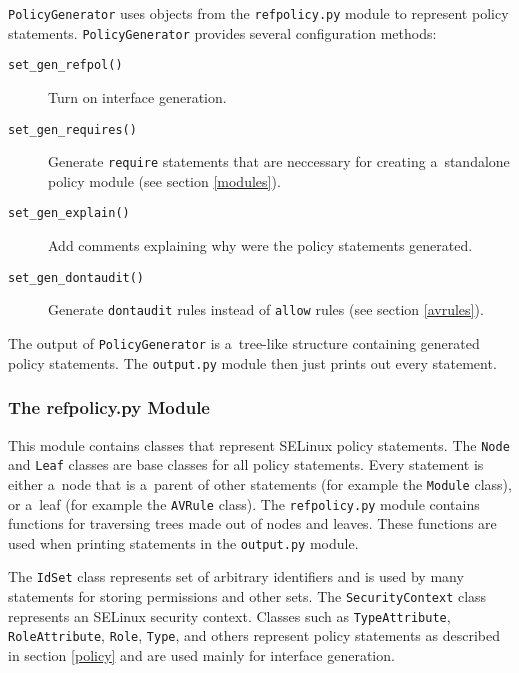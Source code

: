 \texttt{PolicyGenerator} uses objects from the \texttt{refpolicy.py} module
to represent policy statements. \texttt{PolicyGenerator} provides several
configuration methods:
\begin{description}
    \item [\texttt{set\_gen\_refpol()}] Turn on interface generation.
    \item [\texttt{set\_gen\_requires()}] Generate \texttt{require} statements
        that are neccessary for creating a~standalone policy module (see section
        \ref{modules}).
    \item [\texttt{set\_gen\_explain()}] Add comments explaining why were the
        policy statements generated.
    \item [\texttt{set\_gen\_dontaudit()}] Generate \texttt{dontaudit} rules
        instead of \texttt{allow} rules (see section \ref{avrules}).
\end{description}
The output of \texttt{PolicyGenerator} is a~tree-like structure containing
generated policy statements. The \texttt{output.py} module then just prints out
every statement.

\subsubsection{The refpolicy.py Module}
This module contains classes that represent SELinux policy statements. The
\texttt{Node} and \texttt{Leaf} classes are base classes for all policy
statements. Every statement is either a~node that is a~parent of other
statements (for example the \texttt{Module} class), or a~leaf (for example the
\texttt{AVRule} class). The \texttt{refpolicy.py} module contains functions for
traversing trees made out of nodes and leaves. These functions are used when
printing statements in the \texttt{output.py} module.

The \texttt{IdSet} class represents set of arbitrary identifiers and is used by
many statements for storing permissions and other sets. The
\texttt{SecurityContext} class represents an SELinux security context. Classes
such as \texttt{TypeAttribute}, \texttt{RoleAttribute}, \texttt{Role},
\texttt{Type}, and others represent policy statements as described in section
\ref{policy} and are used mainly for interface generation.

